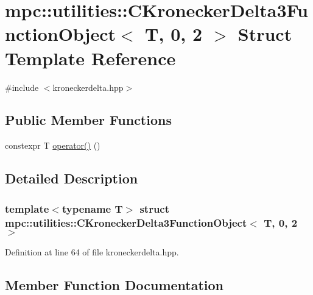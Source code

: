 \hypertarget{structmpc_1_1utilities_1_1_c_kronecker_delta3_function_object_3_01_t_00_010_00_012_01_4}{}\section{mpc\+:\+:utilities\+:\+:C\+Kronecker\+Delta3\+Function\+Object$<$ T, 0, 2 $>$ Struct Template Reference}
\label{structmpc_1_1utilities_1_1_c_kronecker_delta3_function_object_3_01_t_00_010_00_012_01_4}


{\ttfamily \#include $<$kroneckerdelta.\+hpp$>$}

\subsection*{Public Member Functions}
\begin{DoxyCompactItemize}
\item 
constexpr T \mbox{\hyperlink{structmpc_1_1utilities_1_1_c_kronecker_delta3_function_object_3_01_t_00_010_00_012_01_4_ad7f134c3d2139f87688f07d4531117af}{operator()}} ()
\end{DoxyCompactItemize}


\subsection{Detailed Description}
\subsubsection*{template$<$typename T$>$\newline
struct mpc\+::utilities\+::\+C\+Kronecker\+Delta3\+Function\+Object$<$ T, 0, 2 $>$}



Definition at line 64 of file kroneckerdelta.\+hpp.



\subsection{Member Function Documentation}
\mbox{\label{structmpc_1_1utilities_1_1_c_kronecker_delta3_function_object_3_01_t_00_010_00_012_01_4_ad7f134c3d2139f87688f07d4531117af}} 
